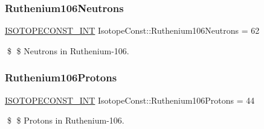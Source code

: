 \subsubsection{\texorpdfstring{Ruthenium106\+Neutrons}{Ruthenium106Neutrons}}
{\footnotesize\ttfamily \mbox{\hyperlink{group___isotope_const-_macros_ga5f18360b3e99483a35c32d789e62621c}{I\+S\+O\+T\+O\+P\+E\+C\+O\+N\+S\+T\+\_\+\+I\+NT}} Isotope\+Const\+::\+Ruthenium106\+Neutrons = 62}

\$ \$ Neutrons in Ruthenium-\/106. \mbox{\label{group___isotope_const-_ruthenium-_ru106_gac56df25f3b912bb392cbc456a7538ed9}} 
\subsubsection{\texorpdfstring{Ruthenium106\+Protons}{Ruthenium106Protons}}
{\footnotesize\ttfamily \mbox{\hyperlink{group___isotope_const-_macros_ga5f18360b3e99483a35c32d789e62621c}{I\+S\+O\+T\+O\+P\+E\+C\+O\+N\+S\+T\+\_\+\+I\+NT}} Isotope\+Const\+::\+Ruthenium106\+Protons = 44}

\$ \$ Protons in Ruthenium-\/106. 